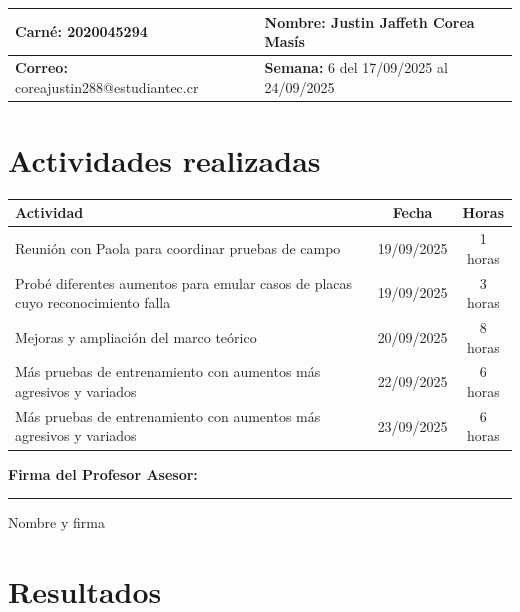 \documentclass[12pt,a4paper]{article}
\begin{document}
\noindent
\begin{tabularx}{\textwidth}{|X|X|}
\hline
\textbf{Carné:} 2020045294 & \textbf{Nombre:} Justin Jaffeth Corea Masís \\
\hline
\textbf{Correo:} coreajustin288@estudiantec.cr & \textbf{Semana:} 6 del 17/09/2025 al 24/09/2025 \\
\hline
\end{tabularx}

\vspace{0.5cm}

\section*{Actividades realizadas}

\begin{tabularx}{\textwidth}{|>{\raggedright\arraybackslash}p{12cm}|c|c|}
\hline
\textbf{Actividad} & \textbf{Fecha} & \textbf{Horas} \\
\hline
	Reunión con Paola para coordinar pruebas de campo & 19/09/2025 & 1 horas \\
\hline
	Probé diferentes aumentos para emular casos de placas cuyo reconocimiento falla & 19/09/2025 & 3 horas \\
\hline
	Mejoras y ampliación del marco teórico & 20/09/2025 & 8 horas \\
\hline
	Más pruebas de entrenamiento con aumentos más agresivos y variados & 22/09/2025 & 6 horas \\
\hline
	Más pruebas de entrenamiento con aumentos más agresivos y variados & 23/09/2025 & 6 horas \\
\hline
\end{tabularx}

\vspace{1cm}

\noindent
\textbf{Firma del Profesor Asesor:}

\vspace{2cm}

\noindent\rule{8cm}{0.4pt}  
Nombre y firma

\newpage

\section{Resultados}
\end{document}
